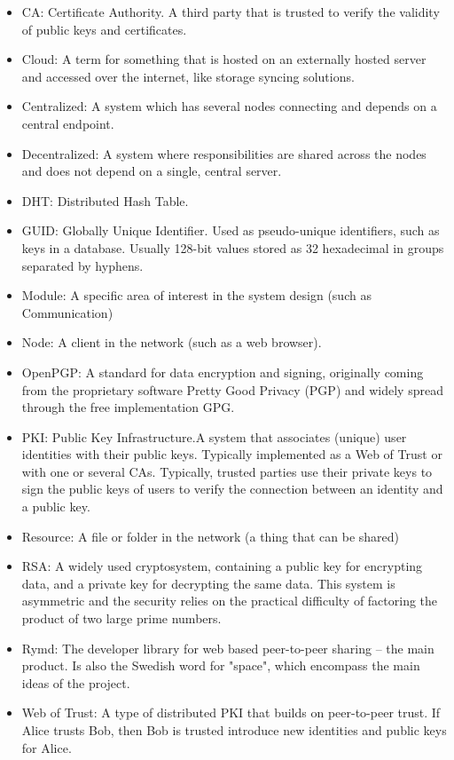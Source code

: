 \begin{itemize}
  \item CA: Certificate Authority. A third party that is trusted to verify the validity of public keys and certificates.
  \item Cloud: A term for something that is hosted on an externally hosted server and accessed over the internet, like storage syncing solutions.
  \item Centralized: A system which has several nodes connecting and depends on a central endpoint.
  \item Decentralized: A system where responsibilities are shared across the nodes and does not depend on a single, central server.
  \item DHT: Distributed Hash Table.
  \item GUID: Globally Unique Identifier. Used as pseudo-unique identifiers, such as keys in a database. Usually 128-bit values stored as 32 hexadecimal in groups separated by hyphens. 
  \item Module: A specific area of interest in the system design (such as Communication)
  \item Node: A client in the network (such as a web browser).
  \item OpenPGP: A standard for data encryption and signing, originally coming from the proprietary software Pretty Good Privacy (PGP) and widely spread through the free implementation GPG.
  \item PKI: Public Key Infrastructure.A system that associates (unique) user identities with their public keys. Typically implemented as a Web of Trust or with one or several CAs. Typically, trusted parties use their private keys to sign the public keys of users to verify the connection between an identity and a public key.
  \item Resource: A file or folder in the network (a thing that can be shared)
  \item RSA: A widely used cryptosystem, containing a public key for encrypting data, and a private key for decrypting the same data. This system is asymmetric and the security relies on the practical difficulty of factoring the product of two large prime numbers.
  \item Rymd: The developer library for web based peer-to-peer sharing – the main product. Is also the Swedish word for "space", which encompass the main ideas of the project.
  \item Web of Trust: A type of distributed PKI that builds on peer-to-peer trust. If Alice trusts Bob, then Bob is trusted introduce new identities and public keys for Alice.
\end{itemize}
